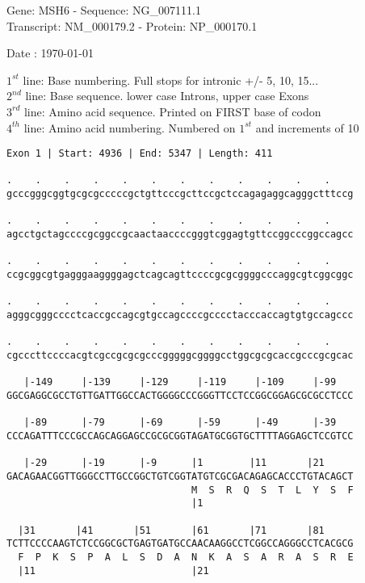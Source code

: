 \documentclass{article}
\begin{document}
\begin{center}
\begin{large}
Gene: MSH6 - Sequence: NG\_007111.1\\
Transcript: NM\_000179.2 - Protein: NP\_000170.1
 
 Date : \today
\end{large}
\end{center}
$1^{st}$ line: Base numbering. Full stops for intronic +/- 5, 10, 15...\\
$2^{nd}$ line: Base sequence. lower case Introns, upper case Exons\\
$3^{rd}$ line: Amino acid sequence. Printed on FIRST base of codon\\
$4^{th}$ line: Amino acid numbering. Numbered on $1^{st}$ and increments of 10\\
\begin{Verbatim}[fontfamily=courier]
Exon 1 | Start: 4936 | End: 5347 | Length: 411

.    .    .    .    .    .    .    .    .    .    .    .    
gcccgggcggtgcgcgcccccgctgttcccgcttccgctccagagaggcagggctttccg

.    .    .    .    .    .    .    .    .    .    .    .    
agcctgctagccccgcggccgcaactaaccccgggtcggagtgttccggcccggccagcc

.    .    .    .    .    .    .    .    .    .    .    .    
ccgcggcgtgagggaaggggagctcagcagttccccgcgcggggcccaggcgtcggcggc

.    .    .    .    .    .    .    .    .    .    .    .    
agggcgggcccctcaccgccagcgtgccagccccgcccctacccaccagtgtgccagccc

.    .    .    .    .    .    .    .    .    .    .    .    
cgcccttccccacgtcgccgcgcgcccgggggcggggcctggcgcgcaccgcccgcgcac

   |-149     |-139     |-129     |-119     |-109     |-99   
GGCGAGGCGCCTGTTGATTGGCCACTGGGGCCCGGGTTCCTCCGGCGGAGCGCGCCTCCC

   |-89      |-79      |-69      |-59      |-49      |-39   
CCCAGATTTCCCGCCAGCAGGAGCCGCGCGGTAGATGCGGTGCTTTTAGGAGCTCCGTCC

   |-29      |-19      |-9      |1        |11       |21     
GACAGAACGGTTGGGCCTTGCCGGCTGTCGGTATGTCGCGACAGAGCACCCTGTACAGCT
                                M  S  R  Q  S  T  L  Y  S  F
                                |1                          

  |31       |41       |51       |61       |71       |81     
TCTTCCCCAAGTCTCCGGCGCTGAGTGATGCCAACAAGGCCTCGGCCAGGGCCTCACGCG
  F  P  K  S  P  A  L  S  D  A  N  K  A  S  A  R  A  S  R  E
  |11                           |21                         

\end{Verbatim}
\end{document}
